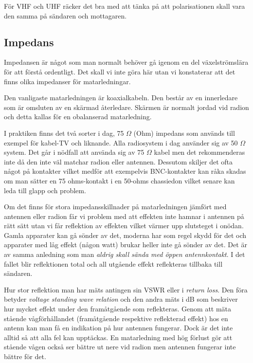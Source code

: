För VHF och UHF räcker det bra med att tänka på att polarisationen skall vara den samma på sändaren och mottagaren.

\subsection{Impedans}

Impedansen är något som man normalt behöver gå igenom en del växelströmslära för att förstå ordentligt. Det skall vi inte göra här utan vi konstaterar att det finns olika impedanser för matarledningar.

Den vanligaste matarledningen är koaxialkabeln. Den består av en innerledare som är omsluten av en skärmad återledare. Skärmen är normalt jordad vid radion och detta kallas för en obalanserad matarledning. 

I praktiken finns det två sorter i dag, 75 $\Omega$ (Ohm) impedans som används till exempel för kabel-TV och liknande. Alla radiosystem i dag använder sig av 50 $\Omega$ system. Det går i nödfall att använda sig av 75 $\Omega$ kabel men det rekommenderas inte då den inte väl matchar radion eller antennen. Dessutom skiljer det ofta något på kontakter vilket medför att exempelvis BNC-kontakter kan råka skadas om man sätter en 75 ohms-kontakt i en 50-ohms chassiedon vilket senare kan leda till glapp och problem.

Om det finns för stora impedansskillnader på matarledningen jämfört med antennen eller radion får vi problem med att effekten inte hamnar i antennen på rätt sätt utan vi får reflektion av effekten vilket värmer upp slutsteget i onödan. Gamla apparater kan gå sönder av det, moderna har som regel skydd för det och apparater med låg effekt (någon watt) brukar heller inte gå sönder av det. Det är av samma anledning som man \textit{aldrig skall sända med öppen antennkontakt}. I det fallet blir reflektionen total och all utgående effekt reflekteras tillbaka till sändaren. 

Hur stor reflektion man har mäts antingen sin VSWR eller i \textit{return loss}. Den föra betyder \textit{voltage standing wave relation} och den andra mäts i dB som beskriver hur mycket effekt under den framåtgående som reflekteras. Genom att mäta stående vågförhållandet (framåtgående respektive reflekterad effekt) hos en antenn kan man få en indikation på hur antennen fungerar. Dock är det inte alltid så att alla fel kan upptäckas. En matarledning med hög förlust gör att stående vågen också ser bättre ut nere vid radion men antennen fungerar inte bättre för det. 

